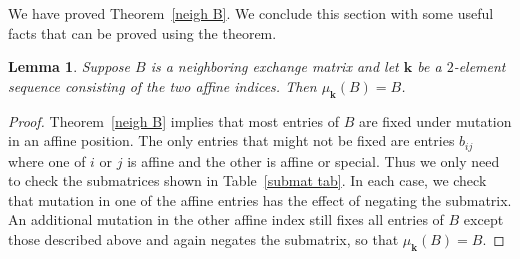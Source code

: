 \documentclass[10pt]{article}
\newtheorem{lemma}[proposition]{Lemma}
\theoremstyle{definition}
\theoremstyle{remark}
\numberwithin{equation}{section}
\newcommand{\0}{{\mathbf{0}}}
\newcommand{\kk}{{\boldsymbol{k}}}
\begin{document}
We have proved Theorem~\ref{neigh B}.
We conclude this section with some useful facts that can be proved using the theorem.

\begin{lemma}\label{affine mut}
Suppose $B$ is a neighboring exchange matrix and let $\kk$ be a $2$-element sequence consisting of the two affine indices. 
Then $\mu_\kk(B)=B$.
\end{lemma}
\begin{proof}
Theorem~\ref{neigh B} implies that most entries of $B$ are fixed under mutation in an affine position.
The only entries that might not be fixed are entries $b_{ij}$ where one of $i$ or $j$ is affine and the other is affine or special.
Thus we only need to check the submatrices shown in Table~\ref{submat tab}.
In each case, we check that mutation in one of the affine entries has the effect of negating the submatrix.
An additional mutation in the other affine index still fixes all entries of $B$ except those described above and again negates the submatrix, so that $\mu_\kk(B)=B$.  

\end{proof}
\end{document}
